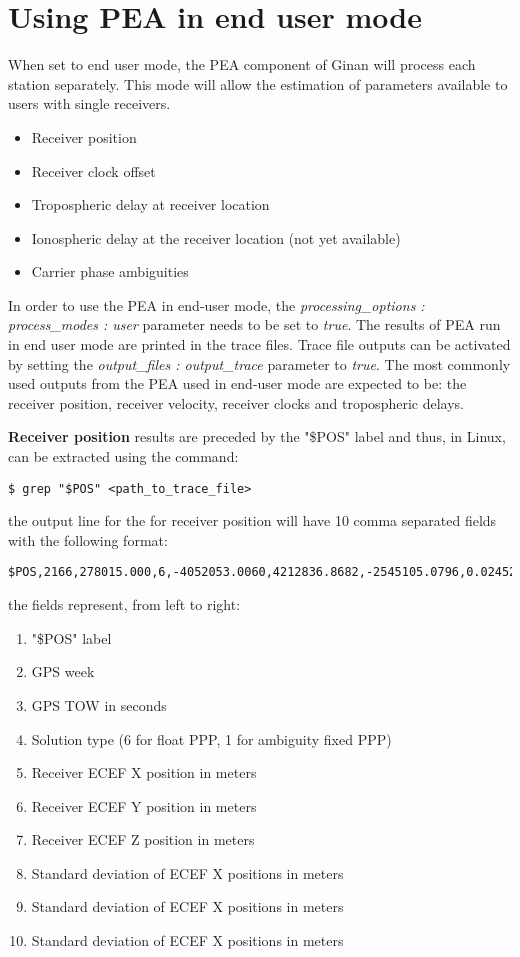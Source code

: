 \chapter{Using PEA in end user mode}
\label{ch:pea_user_mode}
When set to end user mode, the PEA component of Ginan will process each station separately. This mode will allow the estimation of parameters available to users with single receivers. 
\begin{itemize}
	\item Receiver position
	\item Receiver clock offset
	\item Tropospheric delay at receiver location
	\item Ionospheric delay at the receiver location (not yet available)
	\item Carrier phase ambiguities
\end{itemize}
In order to use the PEA in end-user mode, the \textit{ processing\_options : process\_modes : user} parameter needs to be set to \textit{true}.
The results of PEA run in end user mode are printed in the trace files.
Trace file outputs can be activated by setting the \textit{ output\_files : output\_trace} parameter to \textit{true}.
The most commonly used outputs from the PEA used in end-user mode are expected to be: the receiver position, receiver velocity, receiver clocks and tropospheric delays.

\textbf{Receiver position}  results are preceded by the "\$POS" label and thus, in Linux, can be extracted using the command:
 \begin{verbatim}
$ grep "$POS" <path_to_trace_file>
\end{verbatim}
the output line for the for receiver position will have 10 comma separated fields with the following format:
\begin{verbatim}
$POS,2166,278015.000,6,-4052053.0060,4212836.8682,-2545105.0796,0.0245227,0.0231919,0.0163678
\end{verbatim}
the fields represent, from left to right:
\begin{enumerate}
	\item  "\$POS" label
	\item  GPS week
	\item  GPS TOW in seconds
	\item  Solution type (6 for float PPP, 1 for ambiguity fixed PPP)
	\item  Receiver ECEF X position in meters
	\item  Receiver ECEF Y position in meters
	\item  Receiver ECEF Z position in meters
	\item  Standard deviation of ECEF X positions in meters
	\item  Standard deviation of ECEF X positions in meters
	\item  Standard deviation of ECEF X positions in meters
\end{enumerate}

